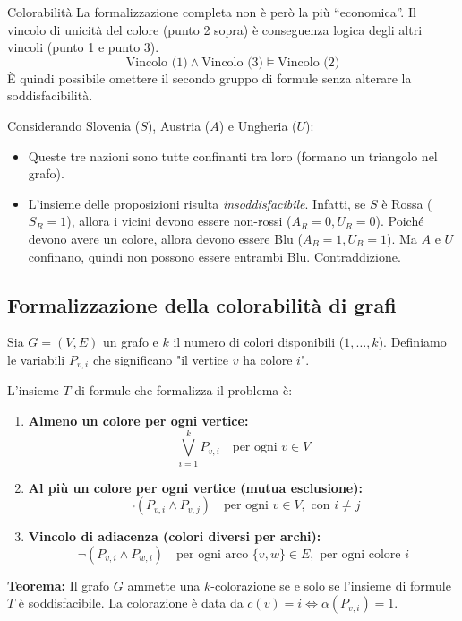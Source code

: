 \documentclass[a4paper,11pt]{report}
\begin{document}
\begin{gframe}{Colorabilità}
La formalizzazione completa non è però la più ``economica''. Il vincolo di unicità del colore (punto 2 sopra) è conseguenza logica degli altri vincoli (punto 1 e punto 3).
\[ \text{Vincolo (1)} \land \text{Vincolo (3)} \models \text{Vincolo (2)} \]
È quindi possibile omettere il secondo gruppo di formule senza alterare la soddisfacibilità.

Considerando Slovenia (\( S \)), Austria (\( A \)) e Ungheria (\( U \)):
\begin{itemize}
    \item Queste tre nazioni sono tutte confinanti tra loro (formano un triangolo nel grafo).
    \item L'insieme delle proposizioni risulta \textit{insoddisfacibile}.
     \subitem Infatti, se \( S \) è Rossa (\( S_R=1 \)), allora i vicini devono essere non-rossi (\( A_R=0, U_R=0 \)). Poiché devono avere un colore, allora devono essere Blu (\( A_B=1, U_B=1 \)). Ma \( A \) e \( U \) confinano, quindi non possono essere entrambi Blu. Contraddizione.
\end{itemize}

\subsection*{Formalizzazione della colorabilità di grafi}

Sia \( G = (V, E) \) un grafo e \( k \) il numero di colori disponibili (\( 1, \dots, k \)).
Definiamo le variabili \( P_{v,i} \) che significano "il vertice \( v \) ha colore \( i \)".

L'insieme \( T \) di formule che formalizza il problema è:

\begin{enumerate}
    \item \textbf{Almeno un colore per ogni vertice:}
    \[ \bigvee_{i=1}^{k} P_{v,i} \quad \text{per ogni } v \in V \]
    
    \item \textbf{Al più un colore per ogni vertice (mutua esclusione):}
    \[ \neg(P_{v,i} \land P_{v,j}) \quad \text{per ogni } v \in V, \text{ con } i \neq j \]
    
    \item \textbf{Vincolo di adiacenza (colori diversi per archi):}
    \[ \neg(P_{v,i} \land P_{w,i}) \quad \text{per ogni arco } \{v, w\} \in E, \text{ per ogni colore } i \]
\end{enumerate}

\textbf{Teorema:} Il grafo \( G \) ammette una \( k \)-colorazione se e solo se l'insieme di formule \( T \) è soddisfacibile. La colorazione è data da \( c(v) = i \iff \alpha(P_{v,i}) = 1 \).

\end{gframe}
\end{document}

